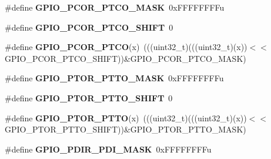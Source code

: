\begin{DoxyCompactItemize}
\item 
\#define {\bfseries G\+P\+I\+O\+\_\+\+P\+C\+O\+R\+\_\+\+P\+T\+C\+O\+\_\+\+M\+A\+SK}~0x\+F\+F\+F\+F\+F\+F\+F\+Fu\hypertarget{group__GPIO__Register__Masks_ga0b8378768ee61ea2c685a1687c90fa03}{}\label{group__GPIO__Register__Masks_ga0b8378768ee61ea2c685a1687c90fa03}

\item 
\#define {\bfseries G\+P\+I\+O\+\_\+\+P\+C\+O\+R\+\_\+\+P\+T\+C\+O\+\_\+\+S\+H\+I\+FT}~0\hypertarget{group__GPIO__Register__Masks_ga5c9203b830cbd86cd8d0189872b5c772}{}\label{group__GPIO__Register__Masks_ga5c9203b830cbd86cd8d0189872b5c772}

\item 
\#define {\bfseries G\+P\+I\+O\+\_\+\+P\+C\+O\+R\+\_\+\+P\+T\+CO}(x)~(((uint32\+\_\+t)(((uint32\+\_\+t)(x))$<$$<$G\+P\+I\+O\+\_\+\+P\+C\+O\+R\+\_\+\+P\+T\+C\+O\+\_\+\+S\+H\+I\+FT))\&G\+P\+I\+O\+\_\+\+P\+C\+O\+R\+\_\+\+P\+T\+C\+O\+\_\+\+M\+A\+SK)\hypertarget{group__GPIO__Register__Masks_ga3a9c3710923cd50fc2df4e678180eb1d}{}\label{group__GPIO__Register__Masks_ga3a9c3710923cd50fc2df4e678180eb1d}

\item 
\#define {\bfseries G\+P\+I\+O\+\_\+\+P\+T\+O\+R\+\_\+\+P\+T\+T\+O\+\_\+\+M\+A\+SK}~0x\+F\+F\+F\+F\+F\+F\+F\+Fu\hypertarget{group__GPIO__Register__Masks_gaa75953b5d9d23bdaa6c24232e1a52680}{}\label{group__GPIO__Register__Masks_gaa75953b5d9d23bdaa6c24232e1a52680}

\item 
\#define {\bfseries G\+P\+I\+O\+\_\+\+P\+T\+O\+R\+\_\+\+P\+T\+T\+O\+\_\+\+S\+H\+I\+FT}~0\hypertarget{group__GPIO__Register__Masks_ga70e5442b3a119665aafb9e6e5b48bbd5}{}\label{group__GPIO__Register__Masks_ga70e5442b3a119665aafb9e6e5b48bbd5}

\item 
\#define {\bfseries G\+P\+I\+O\+\_\+\+P\+T\+O\+R\+\_\+\+P\+T\+TO}(x)~(((uint32\+\_\+t)(((uint32\+\_\+t)(x))$<$$<$G\+P\+I\+O\+\_\+\+P\+T\+O\+R\+\_\+\+P\+T\+T\+O\+\_\+\+S\+H\+I\+FT))\&G\+P\+I\+O\+\_\+\+P\+T\+O\+R\+\_\+\+P\+T\+T\+O\+\_\+\+M\+A\+SK)\hypertarget{group__GPIO__Register__Masks_ga40757476c8889ca9d4cb7017b6c5ab60}{}\label{group__GPIO__Register__Masks_ga40757476c8889ca9d4cb7017b6c5ab60}

\item 
\#define {\bfseries G\+P\+I\+O\+\_\+\+P\+D\+I\+R\+\_\+\+P\+D\+I\+\_\+\+M\+A\+SK}~0x\+F\+F\+F\+F\+F\+F\+F\+Fu\hypertarget{group__GPIO__Register__Masks_gacb7c8cc976937906c8e803811a7fbb68}{}\label{group__GPIO__Register__Masks_gacb7c8cc976937906c8e803811a7fbb68}


\end{DoxyCompactItemize}
